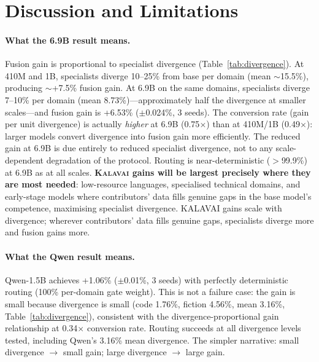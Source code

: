 \documentclass{article}
\newcommand{\kalavai}{\textsc{Kalavai}\xspace}
\begin{document}
\section{Discussion and Limitations}
\label{sec:discussion}

\paragraph{What the 6.9B result means.} Fusion gain is proportional to specialist divergence (Table~\ref{tab:divergence}). At 410M and 1B, specialists diverge 10--25\% from base per domain (mean $\sim$15.5\%), producing $\sim$+7.5\% fusion gain. At 6.9B on the same domains, specialists diverge 7--10\% per domain (mean 8.73\%)---approximately half the divergence at smaller scales---and fusion gain is +6.53\% ($\pm$0.024\%, 3 seeds). The conversion rate (gain per unit divergence) is actually \emph{higher} at 6.9B (0.75$\times$) than at 410M/1B (0.49$\times$): larger models convert divergence into fusion gain more efficiently. The reduced gain at 6.9B is due entirely to reduced specialist divergence, not to any scale-dependent degradation of the protocol. Routing is near-deterministic ($>$99.9\%) at 6.9B as at all scales. \textbf{\kalavai gains will be largest precisely where they are most needed}: low-resource languages, specialised technical domains, and early-stage models where contributors' data fills genuine gaps in the base model's competence, maximising specialist divergence. KALAVAI gains scale with divergence; wherever contributors' data fills genuine gaps, specialists diverge more and fusion gains more.

\paragraph{What the Qwen result means.} Qwen-1.5B achieves +1.06\% ($\pm$0.01\%, 3 seeds) with perfectly deterministic routing (100\% per-domain gate weight). This is not a failure case: the gain is small because divergence is small (code 1.76\%, fiction 4.56\%, mean 3.16\%, Table~\ref{tab:divergence}), consistent with the divergence-proportional gain relationship at 0.34$\times$ conversion rate. Routing succeeds at all divergence levels tested, including Qwen's 3.16\% mean divergence. The simpler narrative: small divergence $\to$ small gain; large divergence $\to$ large gain.
\end{document}
